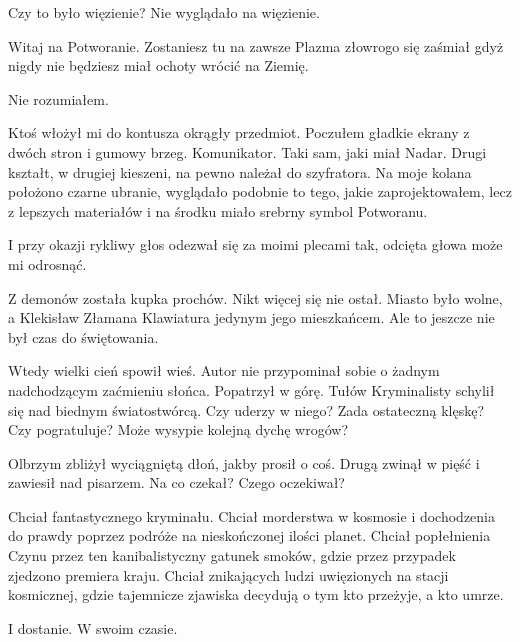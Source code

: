 Czy to było więzienie? Nie wyglądało na więzienie.
\begin{dialogue}
\ds{} Witaj na Potworanie. Zostaniesz tu na zawsze \dm{} Plazma złowrogo się zaśmiał \dm{} gdyż nigdy nie będziesz miał ochoty wrócić na Ziemię.
\end{dialogue}
Nie rozumiałem.

Ktoś włożył mi do kontusza okrągły przedmiot.
Poczułem gładkie ekrany z dwóch stron i gumowy brzeg.
Komunikator. Taki sam, jaki miał Nadar.
Drugi kształt, w drugiej kieszeni, na pewno należał do szyfratora.
Na moje kolana położono czarne ubranie, wyglądało podobnie to tego, jakie zaprojektowałem, lecz z lepszych materiałów i na środku miało srebrny symbol Potworanu.

\begin{dialogue}
\ds{} I przy okazji \dm{} rykliwy głos odezwał się za moimi plecami \dm{} tak, odcięta głowa może mi odrosnąć.
\end{dialogue}

\divider{}

Z demonów została kupka prochów.
Nikt więcej się nie ostał. Miasto było wolne, a Klekisław Złamana Klawiatura jedynym jego mieszkańcem.
Ale to jeszcze nie był czas do świętowania.

Wtedy wielki cień spowił wieś.
Autor nie przypominał sobie o żadnym nadchodzącym zaćmieniu słońca.
Popatrzył w górę.
Tułów Kryminalisty schylił się nad biednym światostwórcą.
Czy uderzy w niego? Zada ostateczną klęskę? Czy pogratuluje? Może wysypie kolejną dychę wrogów?

Olbrzym zbliżył wyciągniętą dłoń, jakby prosił o coś.
Drugą zwinął w pięść i zawiesił nad pisarzem.
Na co czekał? Czego oczekiwał?

Chciał fantastycznego kryminału.
Chciał morderstwa w kosmosie i dochodzenia do prawdy poprzez podróże na nieskończonej ilości planet.
Chciał popłełnienia Czynu przez ten kanibalistyczny gatunek smoków, gdzie przez przypadek zjedzono premiera kraju.
Chciał znikających ludzi uwięzionych na stacji kosmicznej, gdzie tajemnicze zjawiska decydują o tym kto przeżyje, a kto umrze.

I dostanie. W swoim czasie.


